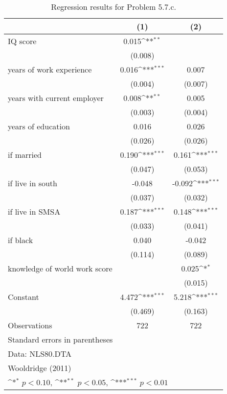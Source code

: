 \begin{table}[htbp]\centering
\def\sym#1{\ifmmode^{#1}\else\(^{#1}\)\fi}
\caption{Regression results for Problem 5.7.c.}
\begin{tabular}{l*{2}{c}}
\toprule
                    &\multicolumn{1}{c}{(1)}         &\multicolumn{1}{c}{(2)}         \\
\midrule
IQ score            &       0.015\sym{**} &                     \\
                    &     (0.008)         &                     \\
\addlinespace
years of work experience&       0.016\sym{***}&       0.007         \\
                    &     (0.004)         &     (0.007)         \\
\addlinespace
years with current employer&       0.008\sym{**} &       0.005         \\
                    &     (0.003)         &     (0.004)         \\
\addlinespace
years of education  &       0.016         &       0.026         \\
                    &     (0.026)         &     (0.026)         \\
\addlinespace
=1 if married       &       0.190\sym{***}&       0.161\sym{***}\\
                    &     (0.047)         &     (0.053)         \\
\addlinespace
=1 if live in south &      -0.048         &      -0.092\sym{***}\\
                    &     (0.037)         &     (0.032)         \\
\addlinespace
=1 if live in SMSA  &       0.187\sym{***}&       0.148\sym{***}\\
                    &     (0.033)         &     (0.041)         \\
\addlinespace
=1 if black         &       0.040         &      -0.042         \\
                    &     (0.114)         &     (0.089)         \\
\addlinespace
knowledge of world work score&                     &       0.025\sym{*}  \\
                    &                     &     (0.015)         \\
\addlinespace
Constant            &       4.472\sym{***}&       5.218\sym{***}\\
                    &     (0.469)         &     (0.163)         \\
\midrule
Observations        &         722         &         722         \\
\bottomrule
\multicolumn{3}{l}{\footnotesize Standard errors in parentheses}\\
\multicolumn{3}{l}{\footnotesize Data: NLS80.DTA}\\
\multicolumn{3}{l}{\footnotesize Wooldridge (2011)}\\
\multicolumn{3}{l}{\footnotesize \sym{*} \(p<0.10\), \sym{**} \(p<0.05\), \sym{***} \(p<0.01\)}\\
\end{tabular}
\end{table}
